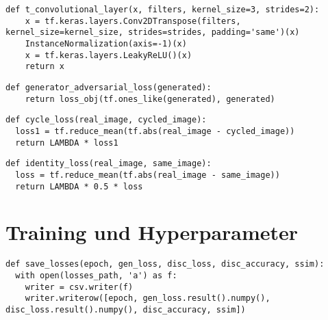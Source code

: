 \newpage
\begin{lstlisting}[language=pyhaff, caption={Transpose Convolutional Block in CycleGAN}, label={cod:cycleGANTransposeConv}]
def t_convolutional_layer(x, filters, kernel_size=3, strides=2):
    x = tf.keras.layers.Conv2DTranspose(filters, kernel_size=kernel_size, strides=strides, padding='same')(x)
    InstanceNormalization(axis=-1)(x)
    x = tf.keras.layers.LeakyReLU()(x)
    return x
\end{lstlisting}

\begin{lstlisting}[language=pyhaff, caption={Adversarieller Verlust des Generators in CycleGAN}, label={cod:cycleGANadversarialLoss}]
def generator_adversarial_loss(generated):
    return loss_obj(tf.ones_like(generated), generated)
\end{lstlisting}

\begin{lstlisting}[language=pyhaff, caption={Zykluskonsistenz Verlust in CycleGAN}, label={cod:cycleLoss}]
def cycle_loss(real_image, cycled_image):
  loss1 = tf.reduce_mean(tf.abs(real_image - cycled_image))
  return LAMBDA * loss1
\end{lstlisting}

\begin{lstlisting}[language=pyhaff, caption={Identitätsverlust in CycleGAN}, label={cod:identityLoss}]
def identity_loss(real_image, same_image):
  loss = tf.reduce_mean(tf.abs(real_image - same_image))
  return LAMBDA * 0.5 * loss
\end{lstlisting}

\newpage

\newpage


\newpage
\section*{Training und Hyperparameter}
\begin{lstlisting}[language=pyhaff, caption={Speicherung der Metriken in CSV-Datei}, label={cod:csvSave}]
def save_losses(epoch, gen_loss, disc_loss, disc_accuracy, ssim):
  with open(losses_path, 'a') as f:
    writer = csv.writer(f)
    writer.writerow([epoch, gen_loss.result().numpy(), disc_loss.result().numpy(), disc_accuracy, ssim])
\end{lstlisting}


